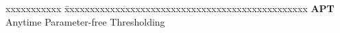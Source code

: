 \documentclass[MS,twoside]{iitmdiss}
\newcommand{\clearemptydoublepage}{\newpage{\cleardoublepage}}
\begin{document}

\clearemptydoublepage
\begin{singlespace}
\tableofcontents

\clearemptydoublepage
\listoftables
{}


\clearemptydoublepage
\listoffigures
{}
\end{singlespace}


\clearemptydoublepage
\abbreviations

\noindent 
\begin{tabbing}
xxxxxxxxxxx \= xxxxxxxxxxxxxxxxxxxxxxxxxxxxxxxxxxxxxxxxxxxxxxxx \kill
\textbf{APT} \> Anytime Parameter-free Thresholding \\

\end{tabbing}
\end{document}
